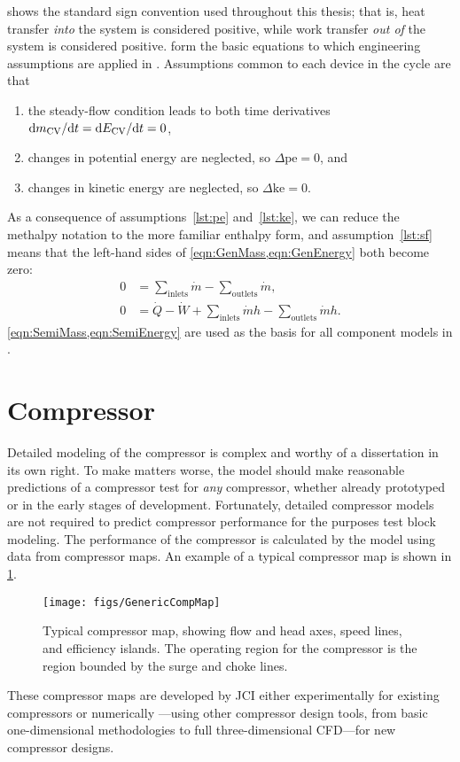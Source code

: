  shows the standard sign convention used throughout this thesis; 
that is, heat transfer \emph{into} the system is considered positive, 
while work transfer \emph{out of} the system is considered positive.
 form the basic equations to which 
engineering assumptions are applied in .
Assumptions common to each device in the cycle are that
\begin{enumerate}
  \item the steady-flow condition leads to both time derivatives $\mathop{}\!\mathrm{d}{m_{\mathrm{CV}}}/\!\mathop{}\!\mathrm{d}{t} = \mathop{}\!\mathrm{d}{E_{\mathrm{CV}}}/\!\mathop{}\!\mathrm{d}{t} = 0$, \label{lst:sf}
  \item changes in potential energy are neglected, so $\Delta \text{pe} = 0$, and \label{lst:pe}
  \item changes in kinetic energy are neglected, so $\Delta \text{ke} = 0$. \label{lst:ke}
\end{enumerate}
As a consequence of assumptions~\ref{lst:pe} and~\ref{lst:ke},
we can reduce the methalpy notation to the more familiar enthalpy form,
and assumption~\ref{lst:sf} means that the left-hand sides of \cref{eqn:GenMass,eqn:GenEnergy} both become zero:
\begin{align}
  0 &= \sum_{\text{inlets}}{\dot{m}} - \sum_{\text{outlets}}{\dot{m}}, \label{eqn:SemiMass}\\
  0 &= \dot{Q} - \dot{W} + \sum_{\text{inlets}}{\dot{m}h} - \sum_{\text{outlets}}{\dot{m}h}. \label{eqn:SemiEnergy}
\end{align}
\cref{eqn:SemiMass,eqn:SemiEnergy} are used as the basis for all component models
in .

\section{Compressor} \label{sec:Compressor}
Detailed modeling of the compressor is complex and worthy of a dissertation in its own right. 
To make matters worse, the model should make reasonable predictions 
of a compressor test for \emph{any} compressor, 
whether already prototyped or in the early stages of development.
Fortunately, detailed compressor models are not required 
to predict compressor performance for the purposes test block modeling. 
The performance of the compressor is calculated by the model using
data from compressor maps. 
An example of a typical compressor map is shown in \cref{fig:GenMap}. 
\begin{figure}[htbp]
  \centering
  \texttt{[image: figs/GenericCompMap]}
  \caption{Typical compressor map, showing flow and head axes, speed lines, and efficiency islands.
    The operating region for the compressor is the region bounded by the surge and choke lines.}
  \label{fig:GenMap}
\end{figure}
These compressor maps are developed by JCI either 
experimentally for existing compressors or numerically%
---using other compressor design tools, from basic one-dimensional methodologies
to full three-dimensional CFD---for new compressor designs.

